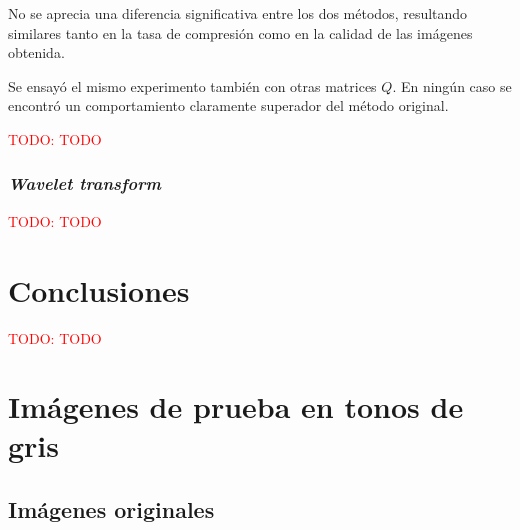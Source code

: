 \documentclass{article}
\newcommand{\TODO}[1]{\textcolor{red}{TODO: #1}}
\begin{document}
No se aprecia una diferencia significativa entre los dos métodos,
resultando similares tanto en la tasa de compresión como en la calidad
de las imágenes obtenida.

Se ensayó el mismo experimento también con otras matrices $Q$.
En ningún caso se encontró un comportamiento claramente superador del método
original.

\TODO{TODO}

\subsubsection{{\em Wavelet transform}}

  \TODO{TODO}

\section{Conclusiones}

\TODO{TODO}

\newpage
\appendix
\section{Imágenes de prueba en tonos de gris}

\subsection{Imágenes originales}
\end{document}
